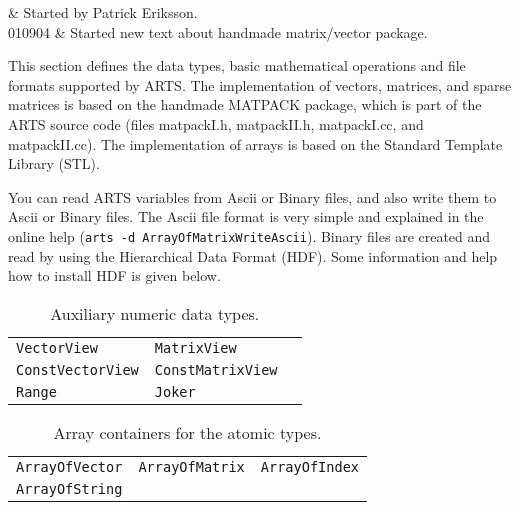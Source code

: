 
 \label{sec:formats}
 
 & Started by Patrick Eriksson. \\
  010904 & Started new text about handmade matrix/vector package.\\
\stophistory

 This section defines the data types, basic mathematical operations
 and file formats supported by ARTS. The implementation of vectors,
 matrices, and sparse matrices is based on the handmade MATPACK
 package, which is part of the ARTS source code (files matpackI.h,
 matpackII.h, matpackI.cc, and matpackII.cc). The implementation of
 arrays is based on the Standard Template Library (STL).
 
 You can read ARTS variables from Ascii or Binary files, and also
 write them to Ascii or Binary files. The Ascii file format is very
 simple and explained in the online help %
 (\verb|arts -d ArrayOfMatrixWriteAscii|).  Binary files are created
 and read by using the Hierarchical Data Format (HDF). Some
 information and help how to install HDF is given below.



 \label{sec:formats:datatypes}

 \begin{table}[t]
  \begin{tabular}{p{4cm} p{4cm} p{4cm}}
   \verb|VectorView|         & \verb|MatrixView|         \\
   \verb|ConstVectorView|    & \verb|ConstMatrixView|    \\
   \verb|Range|              & \verb|Joker| \\
  \end{tabular}
  \caption{Auxiliary numeric data types.}
  \label{table:format:numaux}
 \end{table}

 \begin{table}[t]
  \begin{tabular}{p{4cm} p{4cm} p{4cm}}
   \verb|ArrayOfVector|  & \verb|ArrayOfMatrix|  & \verb|ArrayOfIndex|   \\
   \verb|ArrayOfString|  &                       &                        \\
  \end{tabular}
  \caption{Array containers for the atomic types.}
  \label{table:format:atomicarrays}
 \end{table}

